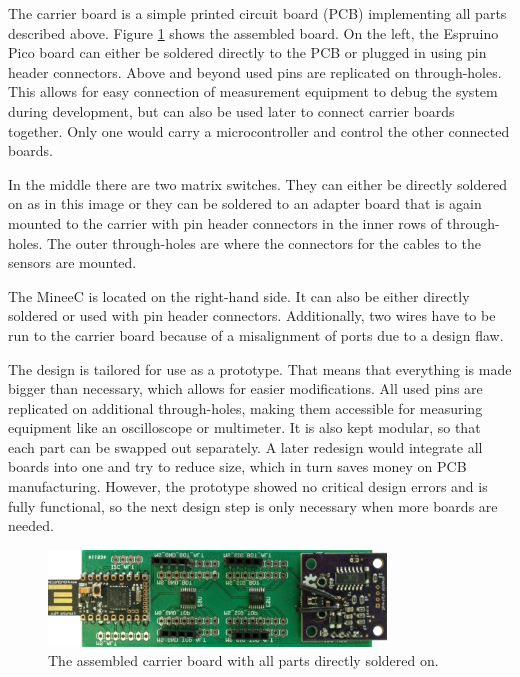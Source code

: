 The carrier board is a simple printed circuit board (PCB) implementing all parts described above. Figure \ref{fig:cb} shows the assembled board. On the left, the Espruino Pico board can either be soldered directly to the PCB or plugged in using pin header connectors. Above and beyond used pins are replicated on through-holes. This allows for easy connection of measurement equipment to debug the system during development, but can also be used later to connect carrier boards together. Only one would carry a microcontroller and control the other connected boards.

In the middle there are two matrix switches. They can either be directly soldered on as in this image or they can be soldered to an adapter board that is again mounted to the carrier with pin header connectors in the inner rows of through-holes.  The outer through-holes are where the connectors for the cables to the sensors are mounted.

The MineeC is located on the right-hand side. It can also be either directly soldered or used with pin header connectors. Additionally, two wires have to be run to the carrier board because of a misalignment of ports due to a design flaw.

The design is tailored for use as a prototype. That means that everything is made bigger than necessary, which allows for easier modifications. All used pins are replicated on additional through-holes, making them accessible for measuring equipment like an oscilloscope or multimeter. It is also kept modular, so that each part can be swapped out separately. A later redesign would integrate all boards into one and try to reduce size, which in turn saves money on PCB manufacturing. However, the prototype showed no critical design errors and is fully functional, so the next design step is only necessary when more boards are needed.

\begin{figure}
	\begin{center}
		\includegraphics[width=0.8\textwidth]{images/cb.jpg} 
		\caption{The assembled carrier board with all parts directly soldered on.}
		\label{fig:cb}
	\end{center}
\end{figure}

